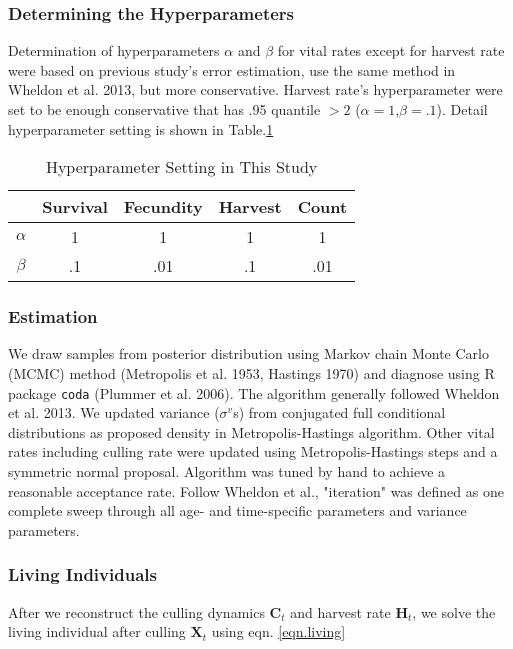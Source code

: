 \documentclass[]{article}
\begin{document}
\subsubsection{Determining the Hyperparameters}
Determination of hyperparameters $\alpha$ and $\beta$ for vital rates except for harvest rate were based on previous study's error estimation, use the same method in Wheldon et al. 2013, but more conservative. Harvest rate's hyperparameter were set to be enough conservative that has .95 quantile $>2$ ($\alpha=1$,$\beta=.1$). Detail hyperparameter setting is shown in Table.\ref{tab:hyper}
\begin{table}[htbp] %
	\centering
	\caption{\label{tab:hyper}Hyperparameter Setting in This Study}
	\begin{tabular}{ccccc}
		\toprule
		&Survival&Fecundity&Harvest&Count \\
		\midrule
		$\alpha$&1&1&1&1\\
		$\beta$ &.1&.01&.1&.01\\
		\bottomrule
	\end{tabular}
\end{table}

\subsubsection{Estimation}
We draw samples from posterior distribution using Markov chain Monte Carlo (MCMC) method (Metropolis et al. 1953, Hastings 1970) and diagnose using R package \texttt{coda} (Plummer et al. 2006). The algorithm generally followed Wheldon et al. 2013. We updated variance ($\sigma^{v}$s) from conjugated full conditional distributions as proposed density in Metropolis-Hastings algorithm. Other vital rates including culling rate were updated using Metropolis-Hastings steps and a symmetric normal proposal. Algorithm was tuned by hand to achieve a reasonable acceptance rate. Follow Wheldon et al., "iteration" was defined as one complete sweep through all age- and time-specific parameters and variance parameters.


\subsubsection{Living Individuals}

After we reconstruct the culling dynamics $\mathbf{C}_{t}$ and harvest rate $\mathbf{H}_{t}$, we solve the living individual after culling $\mathbf{X}_{t}$ using eqn. \ref{eqn.living} 
\end{document}
